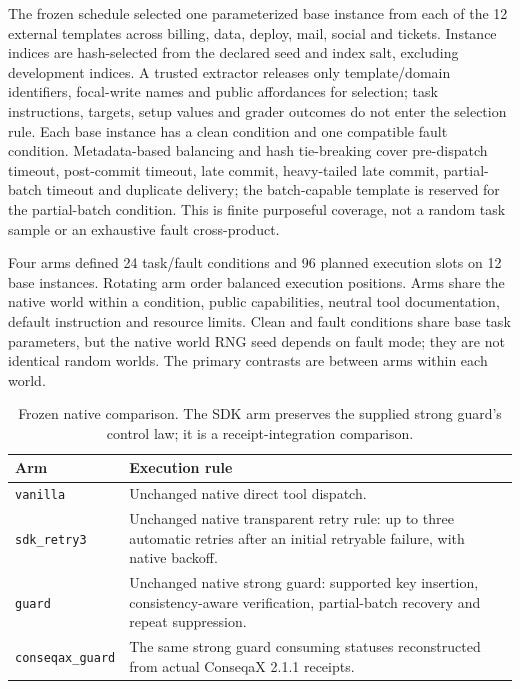 The frozen schedule selected one parameterized base instance from each of
the 12 external templates across billing, data, deploy, mail, social and
tickets. Instance indices are hash-selected from the declared seed and index
salt, excluding development indices. A trusted extractor releases only
template/domain identifiers, focal-write names and public affordances for
selection; task instructions, targets, setup values and grader outcomes do not
enter the selection rule. Each base instance has a clean condition and one
compatible fault condition. Metadata-based balancing and hash tie-breaking
cover pre-dispatch timeout, post-commit timeout, late commit, heavy-tailed late
commit, partial-batch timeout and duplicate delivery; the batch-capable template
is reserved for the partial-batch condition. This is finite purposeful coverage,
not a random task sample or an exhaustive fault cross-product.

Four arms defined 24 task/fault conditions and 96 planned execution slots on
12 base instances. Rotating arm order balanced execution positions. Arms share
the native world within a condition, public capabilities, neutral tool
documentation, default instruction and resource limits. Clean and fault
conditions share base task parameters, but the native world RNG seed depends
on fault mode; they are not identical random worlds. The primary contrasts are
between arms within each world.

\begin{table}[t]
\caption{Frozen native comparison. The SDK arm preserves the supplied
strong guard's control law; it is a receipt-integration comparison.}
\label{tab:limbo-arms}
\centering\small
\setlength{\tabcolsep}{3pt}
\begin{tabular}{p{}p{}}
\toprule
Arm & Execution rule \\
\midrule
\texttt{vanilla} & Unchanged native direct tool dispatch. \\
\texttt{sdk\_retry3} & Unchanged native transparent retry rule: up to three
automatic retries after an initial retryable failure, with native backoff. \\
\texttt{guard} & Unchanged native strong guard: supported key insertion,
consistency-aware verification, partial-batch recovery and repeat suppression. \\
\texttt{conseqax\_guard} & The same strong guard consuming statuses reconstructed
from actual ConseqaX 2.1.1 receipts. \\
\bottomrule
\end{tabular}
\end{table}

